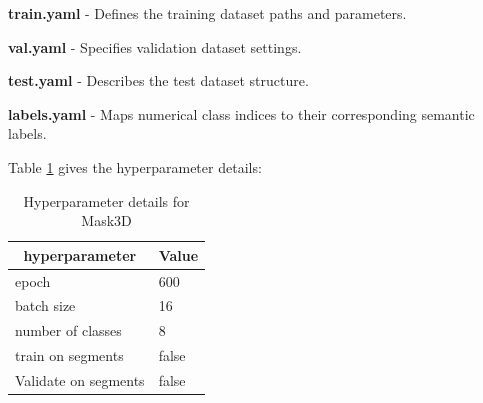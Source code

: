 \begin{description}
  \item \textbf{train.yaml} - Defines the training dataset paths and parameters.
  \item \textbf{val.yaml} - Specifies validation dataset settings.
  \item \textbf{test.yaml} - Describes the test dataset structure.
  \item \textbf{labels.yaml} - Maps numerical class indices to their corresponding semantic labels.
\end{description}
Table \ref{tab:Mask3D} gives the hyperparameter details:
\begin{longtable}{l|l}
  \caption{Hyperparameter details for Mask3D } \label{tab:Mask3D} \\
  \hline \multicolumn{1}{|c|}{\textbf{hyperparameter}} & \multicolumn{1}{c|}{\textbf{Value}} \\ \hline
  epoch & 600 \\
  batch size & 16 \\
  number of classes & 8 \\
  train on segments & false \\
  Validate on segments & false \\
  \hline
\end{longtable}
